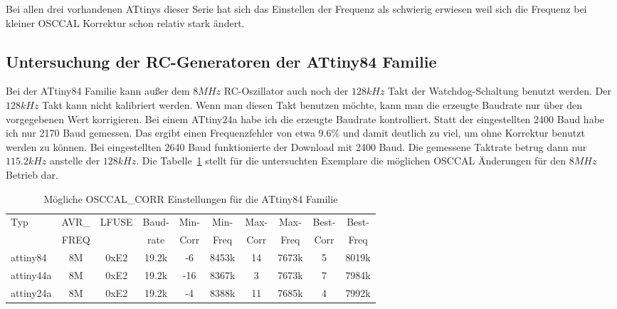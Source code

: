 Bei allen drei vorhandenen ATtinys dieser Serie hat sich das Einstellen der Frequenz
als schwierig erwiesen weil sich die Frequenz bei kleiner OSCCAL Korrektur schon
relativ stark ändert.



\subsection{Untersuchung der RC-Generatoren der ATtiny84 Familie}

Bei der ATtiny84 Familie kann außer dem \(8MHz\) RC-Oszillator auch noch der 
\(128kHz\) Takt der Watchdog-Schaltung benutzt werden.
Der \(128kHz\) Takt kann nicht kalibriert werden. Wenn man diesen Takt benutzen möchte,
kann man die erzeugte Baudrate nur über den vorgegebenen Wert korrigieren.
Bei einem ATtiny24a habe ich die erzeugte Baudrate kontrolliert. Statt der
eingestellten 2400 Baud habe ich nur 2170 Baud gemessen. Das ergibt einen Frequenzfehler
von etwa 9.6\% und damit deutlich zu viel, um ohne Korrektur benutzt werden zu können.
Bei eingestellten 2640 Baud funktionierte der Download mit 2400 Baud.
Die gemessene Taktrate betrug dann nur \(115.2kHz\) anstelle der \(128kHz\).
Die Tabelle~\ref{tab:tiny84freq} stellt für die untersuchten Exemplare die möglichen
OSCCAL Änderungen für den \(8MHz\) Betrieb dar.

\begin{table}[H]
  \begin{center}
    \begin{tabular}{| l | c | c | c || c | c || c | c || c | c |}
    \hline
   Typ  &       AVR\_ & LFUSE & Baud- & Min- & Min- & Max- & Max- & Best- & Best-  \\
        &       FREQ  &       & rate & Corr & Freq & Corr & Freq  & Corr  & Freq  \\
    \hline
    \hline
attiny84 &          8M & 0xE2  & 19.2k &  -6  & 8453k & 14  & 7673k  & 5  & 8019k \\
    \hline
attiny44a &         8M & 0xE2  & 19.2k &  -16  & 8367k & 3  & 7673k  & 7  & 7984k \\
    \hline
attiny24a &         8M & 0xE2  & 19.2k &  -4  & 8388k & 11  & 7685k  & 4  & 7992k \\
    \hline
    \end{tabular}
  \end{center}
  \caption{Mögliche OSCCAL\_CORR Einstellungen für die ATtiny84 Familie}
  \label{tab:tiny84freq}
\end{table}

